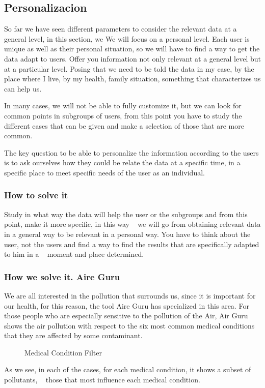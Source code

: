 \subsection{Personalizacion}
So far we have seen different parameters to consider the relevant data at a general level, in this section, we
We will focus on a personal level.
Each user is unique as well as their personal situation, so we will have to find a way to get the data
adapt to users. Offer you information not only relevant at a general level but at a particular level.
Posing that we need to be told the data in my case, by the place where I live, by
my health, family situation, something that characterizes us can help us.

In many cases, we will not be able to fully customize it, but we can look for common points in subgroups of
users, from this point you have to study the different cases that can be given and make a selection of those that are
more common.

The key question to be able to personalize the information according to the users is to ask ourselves how they could be
relate the data at a specific time, in a specific place to meet specific needs of the
user as an individual.

\subsubsection{How to solve it} 

Study in what way the data will help the user or the subgroups and from this point, make it more specific, in this way
  we will go from obtaining relevant data in a general way to be relevant in a personal way. You have to think about the
  user, not the users and find a way to find the results that are specifically adapted to him in a
  moment and place determined.

\subsubsection{How we solve it. Aire Guru} 
 We are all interested in the pollution that surrounds us, since it is important for our health, for this reason, the tool
 Aire Guru has specialized in this area. For those people who are especially sensitive to the pollution of the
 Air, Air Guru shows the air pollution with respect to the six most common medical conditions that
 they are affected by some contaminant.
 

\begin{figure}[ht]
    \centering
    \hfill
    \hfill
  
  \caption{Medical Condition Filter}
    \end{figure}
    As we see, in each of the cases, for each medical condition, it shows a subset of pollutants,
      those that most influence each medical condition.
    
